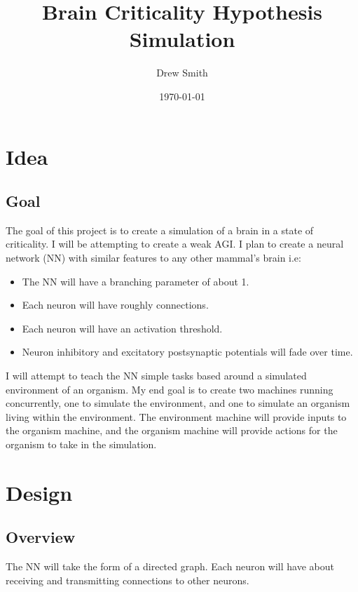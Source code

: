 \documentclass{article} %
\title{Brain Criticality Hypothesis Simulation} %
\author{Drew Smith} %
\date{\today} %
\begin{document}
    \maketitle %
    

    \section{Idea} %
        
        \subsection{Goal}
            The goal of this project is to create a simulation of a brain in a state of criticality. I will be attempting to create a weak AGI. I plan to create a neural network (NN) with similar features to any other mammal's brain i.e:
        
            \begin{itemize}[noitemsep]
                \item The NN will have a branching parameter of about 1.
                \item Each neuron will have roughly \connectionCount{ }connections.
                \item Each neuron will have an activation threshold.
                \item Neuron inhibitory and excitatory postsynaptic potentials will fade over time.
            \end{itemize}

            I will attempt to teach the NN simple tasks based around a simulated environment of an organism. My end goal is to create two machines running concurrently, one to simulate the environment, and one to simulate an organism living within the environment. The environment machine will provide inputs to the organism machine, and the organism machine will provide actions for the organism to take in the simulation.


    \section{Design}
        
        \subsection{Overview}
            The NN will take the form of a directed graph. Each neuron will have about \connectionCount{ }receiving and transmitting connections to other neurons.
        
\end{document}
